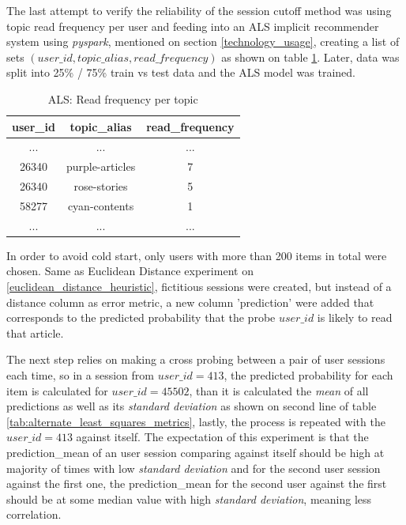 \documentclass[ecp,tc,english]{iiufrgs}
\begin{document}
        The last attempt to verify the reliability of the session cutoff method was using topic read frequency per user and feeding into an ALS implicit recommender system using \textit{pyspark}, mentioned on section \ref{technology_usage}, creating a list of sets \((user\_id, topic\_alias, read\_frequency)\) as shown on table \ref{tab:als_read_frequency}. Later, data was split into 25\% / 75\% train vs test data and the ALS model was trained.
        
        \begin{table}[H]
            \centering
            \begin{tabular}{ |c|c|c| } 
                \hline
                user\_id & topic\_alias & read\_frequency \\
                \hline 
                ... & ... & ... \\
                26340 & purple-articles & 7 \\ 
                26340 & rose-stories & 5 \\ 
                58277 & cyan-contents & 1 \\ 
                ... & ... & ... \\
                \hline
            \end{tabular}
            \caption{ALS: Read frequency per topic}
            \label{tab:als_read_frequency}
        \end{table}
        
        In order to avoid cold start, only users with more than 200 items in total were chosen.
        Same as Euclidean Distance experiment on \ref{euclidean_distance_heuristic}, fictitious sessions were created, but instead of a distance column as error metric, a new column 'prediction' were added that corresponds to the predicted probability that the probe \(user\_id\) is likely to read that article.

        The next step relies on making a cross probing between a pair of user sessions each time, so in a session from \(user\_id = 413\), the predicted probability for each item is calculated for \(user\_id = 45502\), than it is calculated the \textit{mean} of all predictions as well as its \textit{standard deviation} as shown on second line of table \ref{tab:alternate_least_squares_metrics}, lastly, the process is repeated with the \(user\_id = 413\) against itself. The expectation of this experiment is that the prediction\_mean of an user session comparing against itself should be high at majority of times with low \textit{standard deviation} and for the second user session against the first one, the prediction\_mean for the second user against the first should be at some median value with high \textit{standard deviation}, meaning less correlation.
        
\end{document}
